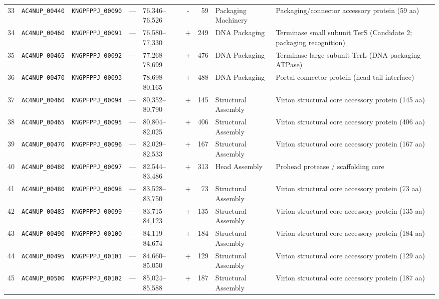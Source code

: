 \begin{landscape}
\begin{xltabular}{\linewidth}{cp{2.4cm}p{2.4cm}p{1.4cm}p{2.6cm}crp{3.2cm}X}
33 & \texttt{AC4NUP\_00440} & \texttt{KNGPFPPJ\_00090} & --- & 76,346--76,526 & - & 59 & Packaging Machinery & Packaging/connector accessory protein (59 aa) \\
34 & \texttt{AC4NUP\_00460} & \texttt{KNGPFPPJ\_00091} & --- & 76,580--77,330 & + & 249 & DNA Packaging & Terminase small subunit TerS (Candidate 2; packaging recognition) \\
35 & \texttt{AC4NUP\_00465} & \texttt{KNGPFPPJ\_00092} & --- & 77,268--78,699 & + & 476 & DNA Packaging & Terminase large subunit TerL (DNA packaging ATPase) \\
36 & \texttt{AC4NUP\_00470} & \texttt{KNGPFPPJ\_00093} & --- & 78,698--80,165 & + & 488 & DNA Packaging & Portal connector protein (head-tail interface) \\
37 & \texttt{AC4NUP\_00460} & \texttt{KNGPFPPJ\_00094} & --- & 80,352--80,790 & + & 145 & Structural Assembly & Virion structural core accessory protein (145 aa) \\
38 & \texttt{AC4NUP\_00465} & \texttt{KNGPFPPJ\_00095} & --- & 80,804--82,025 & + & 406 & Structural Assembly & Virion structural core accessory protein (406 aa) \\
39 & \texttt{AC4NUP\_00470} & \texttt{KNGPFPPJ\_00096} & --- & 82,029--82,533 & + & 167 & Structural Assembly & Virion structural core accessory protein (167 aa) \\
40 & \texttt{AC4NUP\_00480} & \texttt{KNGPFPPJ\_00097} & --- & 82,544--83,486 & + & 313 & Head Assembly & Prohead protease / scaffolding core \\
41 & \texttt{AC4NUP\_00480} & \texttt{KNGPFPPJ\_00098} & --- & 83,528--83,750 & + & 73 & Structural Assembly & Virion structural core accessory protein (73 aa) \\
42 & \texttt{AC4NUP\_00485} & \texttt{KNGPFPPJ\_00099} & --- & 83,715--84,123 & + & 135 & Structural Assembly & Virion structural core accessory protein (135 aa) \\
43 & \texttt{AC4NUP\_00490} & \texttt{KNGPFPPJ\_00100} & --- & 84,119--84,674 & + & 184 & Structural Assembly & Virion structural core accessory protein (184 aa) \\
44 & \texttt{AC4NUP\_00495} & \texttt{KNGPFPPJ\_00101} & --- & 84,660--85,050 & + & 129 & Structural Assembly & Virion structural core accessory protein (129 aa) \\
45 & \texttt{AC4NUP\_00500} & \texttt{KNGPFPPJ\_00102} & --- & 85,024--85,588 & + & 187 & Structural Assembly & Virion structural core accessory protein (187 aa) \\

\end{xltabular}
\end{landscape}

